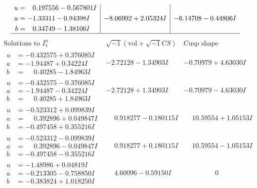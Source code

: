 \documentclass[1p]{elsarticle_modified}
\theoremstyle{definition}
\newcommand{\I}{\sqrt{-1}}
\begin{document}
$$\begin{array}{c|c|c}
\begin{aligned}
u &= \phantom{-}0.197556 - 0.567801 I \\
a &= -1.33311 - 0.94398 I \\
b &= \phantom{-}0.34749 - 1.38106 I\end{aligned}
 & -8.06992 + 2.05324 I & -6.14708 - 0.44806 I\\
 \hline 
 \end{array}$$\newpage$$\begin{array}{c|c|c}  
\text{Solutions to }I^u_{1}& \I (\text{vol} + \sqrt{-1}CS) & \text{Cusp shape}\\
 \hline 
\begin{aligned}
u &= -0.432575 + 0.376085 I \\
a &= -1.94487 + 0.34224 I \\
b &= \phantom{-}0.40285 - 1.84963 I\end{aligned}
 & -2.72128 - 1.34903 I & -0.70979 + 4.63030 I \\ \hline\begin{aligned}
u &= -0.432575 - 0.376085 I \\
a &= -1.94487 - 0.34224 I \\
b &= \phantom{-}0.40285 + 1.84963 I\end{aligned}
 & -2.72128 + 1.34903 I & -0.70979 - 4.63030 I \\ \hline\begin{aligned}
u &= -0.523312 + 0.099839 I \\
a &= \phantom{-}0.392896 + 0.049847 I \\
b &= -0.497458 + 0.355216 I\end{aligned}
 & \phantom{-}0.918277 - 0.180115 I & \phantom{-}10.59554 + 1.05153 I \\ \hline\begin{aligned}
u &= -0.523312 - 0.099839 I \\
a &= \phantom{-}0.392896 - 0.049847 I \\
b &= -0.497458 - 0.355216 I\end{aligned}
 & \phantom{-}0.918277 + 0.180115 I & \phantom{-}10.59554 - 1.05153 I \\ \hline\begin{aligned}
u &= -1.48986 + 0.04819 I \\
a &= -0.213305 - 0.758850 I \\
b &= -0.383824 + 1.018250 I\end{aligned}
 & \phantom{-}4.60096 - 0.59150 I & \phantom{-0.000000 } 0 \\ \hline\begin{aligned}

\end{aligned}
\end{array}$$
\end{document}
